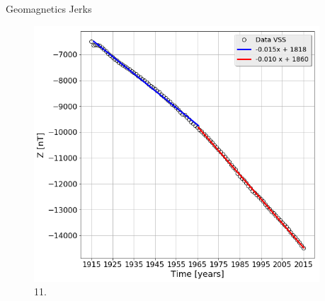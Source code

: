 \documentclass[final,t]{beamer}
\begin{document}
\begin{columns}[t]
\begin{column}{.66\linewidth}
\begin{columns}
\begin{column}{.31\linewidth}
\begin{block}{Geomagnetics Jerks}
		
		\begin{figure}
			\centering
			\includegraphics[scale=0.8]{"figs_ed/Linear regression Z_v3"}
			\caption{11.}
			\label{fig:g_Sintetico}
		\end{figure}

		
	\end{block}
\end{column}	

\end{columns}

\end{column}
\begin{column}{.33\linewidth}



\end{column}
\end{columns}
\end{document}
